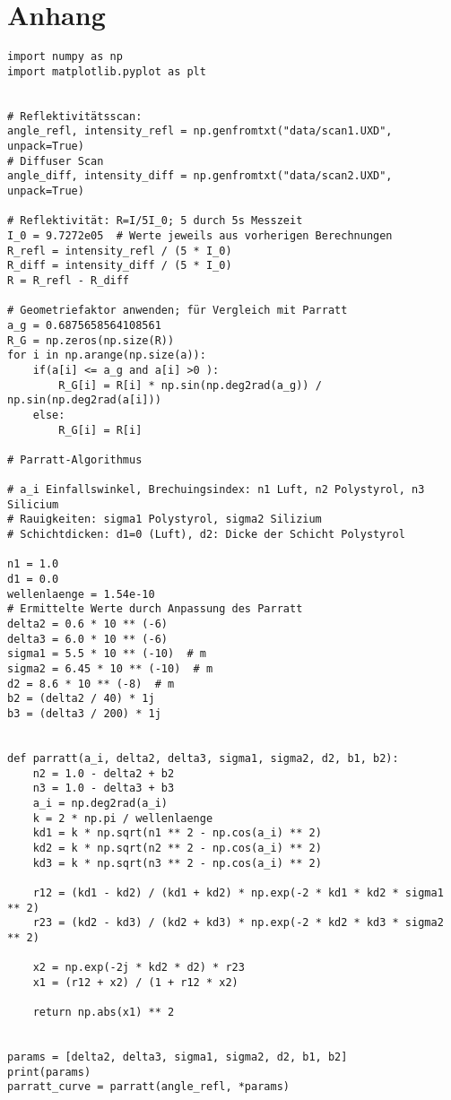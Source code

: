 \section{Anhang}
\label{sec:anhang}
\begin{lstlisting}
import numpy as np
import matplotlib.pyplot as plt


# Reflektivitätsscan:
angle_refl, intensity_refl = np.genfromtxt("data/scan1.UXD", unpack=True)
# Diffuser Scan
angle_diff, intensity_diff = np.genfromtxt("data/scan2.UXD", unpack=True)

# Reflektivität: R=I/5I_0; 5 durch 5s Messzeit
I_0 = 9.7272e05  # Werte jeweils aus vorherigen Berechnungen
R_refl = intensity_refl / (5 * I_0)
R_diff = intensity_diff / (5 * I_0)
R = R_refl - R_diff

# Geometriefaktor anwenden; für Vergleich mit Parratt
a_g = 0.6875658564108561
R_G = np.zeros(np.size(R))
for i in np.arange(np.size(a)):
    if(a[i] <= a_g and a[i] >0 ):
        R_G[i] = R[i] * np.sin(np.deg2rad(a_g)) / np.sin(np.deg2rad(a[i])) 
    else:
        R_G[i] = R[i]

# Parratt-Algorithmus

# a_i Einfallswinkel, Brechuingsindex: n1 Luft, n2 Polystyrol, n3 Silicium
# Rauigkeiten: sigma1 Polystyrol, sigma2 Silizium
# Schichtdicken: d1=0 (Luft), d2: Dicke der Schicht Polystyrol

n1 = 1.0
d1 = 0.0
wellenlaenge = 1.54e-10
# Ermittelte Werte durch Anpassung des Parratt
delta2 = 0.6 * 10 ** (-6)
delta3 = 6.0 * 10 ** (-6)
sigma1 = 5.5 * 10 ** (-10)  # m
sigma2 = 6.45 * 10 ** (-10)  # m
d2 = 8.6 * 10 ** (-8)  # m
b2 = (delta2 / 40) * 1j
b3 = (delta3 / 200) * 1j


def parratt(a_i, delta2, delta3, sigma1, sigma2, d2, b1, b2):
    n2 = 1.0 - delta2 + b2 
    n3 = 1.0 - delta3 + b3
    a_i = np.deg2rad(a_i)
    k = 2 * np.pi / wellenlaenge
    kd1 = k * np.sqrt(n1 ** 2 - np.cos(a_i) ** 2)
    kd2 = k * np.sqrt(n2 ** 2 - np.cos(a_i) ** 2)
    kd3 = k * np.sqrt(n3 ** 2 - np.cos(a_i) ** 2)

    r12 = (kd1 - kd2) / (kd1 + kd2) * np.exp(-2 * kd1 * kd2 * sigma1 ** 2)
    r23 = (kd2 - kd3) / (kd2 + kd3) * np.exp(-2 * kd2 * kd3 * sigma2 ** 2)

    x2 = np.exp(-2j * kd2 * d2) * r23
    x1 = (r12 + x2) / (1 + r12 * x2)

    return np.abs(x1) ** 2


params = [delta2, delta3, sigma1, sigma2, d2, b1, b2]
print(params)
parratt_curve = parratt(angle_refl, *params)


\end{lstlisting}

